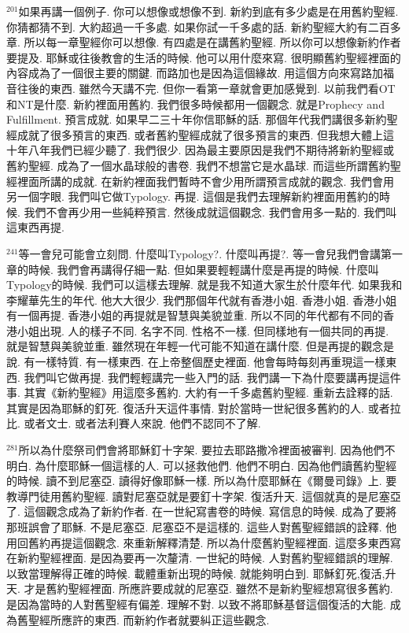 \documentclass{book}
\begin{document}
$^{201}$如果再講一個例子.
你可以想像或想像不到.
新約到底有多少處是在用舊約聖經.
你猜都猜不到.
大約超過一千多處.
如果你試一千多處的話.
新約聖經大約有二百多章.
所以每一章聖經你可以想像.
有四處是在講舊約聖經.
所以你可以想像新約作者要提及.
耶穌或往後教會的生活的時候.
他可以用什麼來寫.
很明顯舊約聖經裡面的內容成為了一個很主要的關鍵.
而路加也是因為這個緣故.
用這個方向來寫路加福音往後的東西.
雖然今天講不完.
但你一看第一章就會更加感覺到.
以前我們看OT和NT是什麼.
新約裡面用舊約.
我們很多時候都用一個觀念.
就是Prophecy and Fulfillment.
預言成就.
如果早二三十年你信耶穌的話.
那個年代我們講很多新約聖經成就了很多預言的東西.
或者舊約聖經成就了很多預言的東西.
但我想大體上這十年八年我們已經少聽了.
我們很少.
因為最主要原因是我們不期待將新約聖經或舊約聖經.
成為了一個水晶球般的書卷.
我們不想當它是水晶球.
而這些所謂舊約聖經裡面所講的成就.
在新約裡面我們暫時不會少用所謂預言成就的觀念.
我們會用另一個字眼.
我們叫它做Typology.
再提.
這個是我們去理解新約裡面用舊約的時候.
我們不會再少用一些純粹預言.
然後成就這個觀念.
我們會用多一點的.
我們叫這東西再提.

$^{241}$等一會兒可能會立刻問.
什麼叫Typology?.
什麼叫再提?.
等一會兒我們會講第一章的時候.
我們會再講得仔細一點.
但如果要輕輕講什麼是再提的時候.
什麼叫Typology的時候.
我們可以這樣去理解.
就是我不知道大家生於什麼年代.
如果我和李耀華先生的年代.
他大大很少.
我們那個年代就有香港小姐.
香港小姐.
香港小姐有一個再提.
香港小姐的再提就是智慧與美貌並重.
所以不同的年代都有不同的香港小姐出現.
人的樣子不同.
名字不同.
性格不一樣.
但同樣地有一個共同的再提.
就是智慧與美貌並重.
雖然現在年輕一代可能不知道在講什麼.
但是再提的觀念是說.
有一樣特質.
有一樣東西.
在上帝整個歷史裡面.
他會每時每刻再重現這一樣東西.
我們叫它做再提.
我們輕輕講完一些入門的話.
我們講一下為什麼要講再提這件事.
其實《新約聖經》用這麼多舊約.
大約有一千多處舊約聖經.
重新去詮釋的話.
其實是因為耶穌的釘死.
復活升天這件事情.
對於當時一世紀很多舊約的人.
或者拉比.
或者文士.
或者法利賽人來說.
他們不認同不了解.

$^{281}$所以為什麼祭司們會將耶穌釘十字架.
要拉去耶路撒冷裡面被審判.
因為他們不明白.
為什麼耶穌一個這樣的人.
可以拯救他們.
他們不明白.
因為他們讀舊約聖經的時候.
讀不到尼塞亞.
讀得好像耶穌一樣.
所以為什麼耶穌在《爾曼司錄》上.
要教導門徒用舊約聖經.
讀對尼塞亞就是要釘十字架.
復活升天.
這個就真的是尼塞亞了.
這個觀念成為了新約作者.
在一世紀寫書卷的時候.
寫信息的時候.
成為了要將那班誤會了耶穌.
不是尼塞亞.
尼塞亞不是這樣的.
這些人對舊聖經錯誤的詮釋.
他用回舊約再提這個觀念.
來重新解釋清楚.
所以為什麼舊約聖經裡面.
這麼多東西寫在新約聖經裡面.
是因為要再一次釐清.
一世紀的時候.
人對舊約聖經錯誤的理解.
以致當理解得正確的時候.
載體重新出現的時候.
就能夠明白到.
耶穌釘死,復活,升天.
才是舊約聖經裡面.
所應許要成就的尼塞亞.
雖然不是新約聖經想寫很多舊約.
是因為當時的人對舊聖經有偏差.
理解不對.
以致不將耶穌基督這個復活的大能.
成為舊聖經所應許的東西.
而新約作者就要糾正這些觀念.
\end{document}
